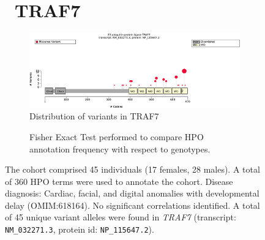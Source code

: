 \begin{figure}[htbp]
\section*{ TRAF7}
\centering
\begin{subfigure}[b]{0.95\textwidth}
\centering
\includegraphics[width=\textwidth]{ img/TRAF7_protein_diagram.pdf} 
\captionsetup{justification=raggedright,singlelinecheck=false}
\caption{Distribution of variants in TRAF7}
\end{subfigure}

\vspace{2em}

\begin{subfigure}[b]{0.95\textwidth}
\centering
{}
\captionsetup{justification=raggedright,singlelinecheck=false}
\caption{Fisher Exact Test performed to compare HPO annotation frequency with respect to genotypes.}
\end{subfigure}

\vspace{2em}

\caption{ The cohort comprised 45 individuals (17 females, 28 males). A total of 360 HPO terms were used to annotate the cohort. Disease diagnosis: Cardiac, facial, and digital anomalies with developmental delay (OMIM:618164). No significant correlations identified. A total of 45 unique variant alleles were found in \textit{TRAF7} (transcript: \texttt{NM\_032271.3}, protein id: \texttt{NP\_115647.2}).}
\end{figure}
